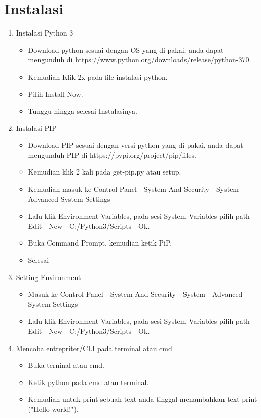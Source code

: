\section{Instalasi}

\begin{enumerate}
\item Instalasi Python 3
\begin{itemize} 
\item Download python sesuai dengan OS yang di pakai, anda dapat mengunduh di https://www.python.org/downloads/release/python-370.
\item Kemudian Klik 2x pada file instalasi python.
\item Pilih Install Now.
\item Tunggu hingga selesai Instalasinya.
\end{itemize}


\item Instalasi PIP

\begin{itemize} 
\item Download PIP sesuai dengan versi python yang di pakai, anda dapat mengunduh PIP di https://pypi.org/project/pip/files.
\item Kemudian klik 2 kali pada get-pip.py atau setup.
\item Kemudian masuk ke Control Panel - System And Security - System - Advanced System Settings
\item Lalu klik Environment Variables, pada sesi System Variables pilih path - Edit - New - C:/Python3/Scripts - Ok.
\item Buka Command Prompt, kemudian ketik PiP.
\item Selesai
\end{itemize}


\item Setting Environment

\begin{itemize} 
\item Masuk ke Control Panel - System And Security - System - Advanced System Settings
\item Lalu klik Environment Variables, pada sesi System Variables pilih path - Edit - New - C:/Python3/Scripts - Ok.
\end{itemize} 


\item Mencoba entrepriter/CLI pada terminal atau cmd

\begin{itemize}
\item Buka terninal atau cmd.
\item Ketik python pada cmd atau terminal.
\item Kemudian untuk print sebuah text anda tinggal menambahkan text print ("Hello world!").
\end{itemize}



\end{enumerate}
